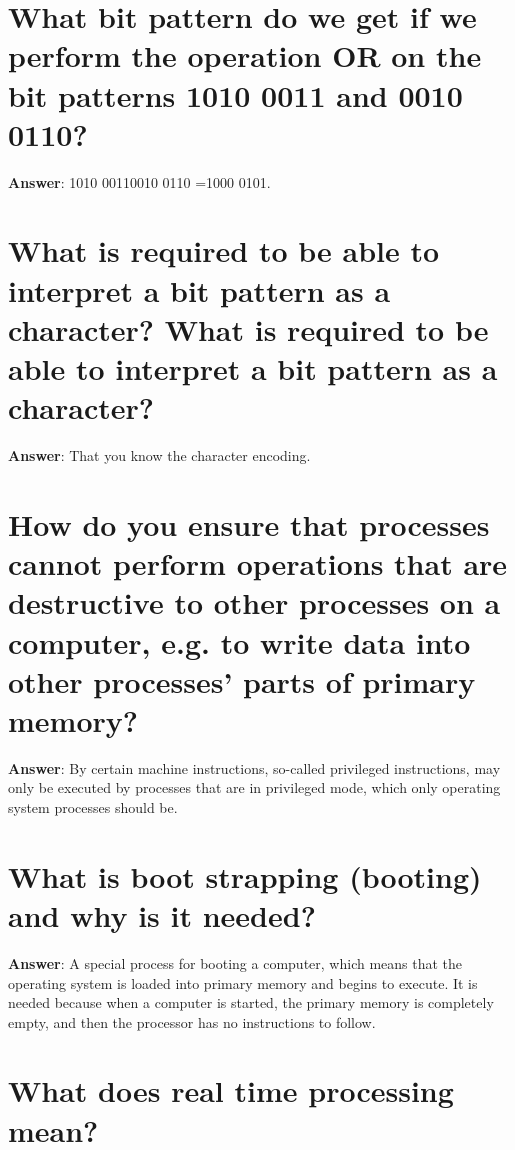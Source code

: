 \documentclass[a4paper,11pt,oneside]{book}
\begin{document}
\begin{sloppypar}
\section{What bit pattern do we get if we perform the operation OR on the bit patterns 1010 0011 and 0010 0110?}

\label{q:101:sa:en:True}

\textbf{Answer}: 1010 00110010 0110 =1000 0101.



\section{What is required to be able to interpret a bit pattern as a character? What is required to be able to interpret a bit pattern as a character?}

\label{q:102:sa:en:True}

\textbf{Answer}: That you know the character encoding.



\section{How do you ensure that processes cannot perform operations that are destructive to other processes on a computer, e.g. to write data into other processes' parts of primary memory?}

\label{q:104:sa:en:True}

\textbf{Answer}: By certain machine instructions, so-called privileged instructions, may only be executed by processes that are in privileged mode, which only operating system processes should be.



\section{What is boot strapping (booting) and why is it needed?}

\label{q:105:sa:en:True}

\textbf{Answer}: A special process for booting a computer, which means that the operating system is loaded into primary memory and begins to execute. It is needed because when a computer is started, the primary memory is completely empty, and then the processor has no instructions to follow.



\section{What does real time processing mean?}


\end{sloppypar}
\end{document}
